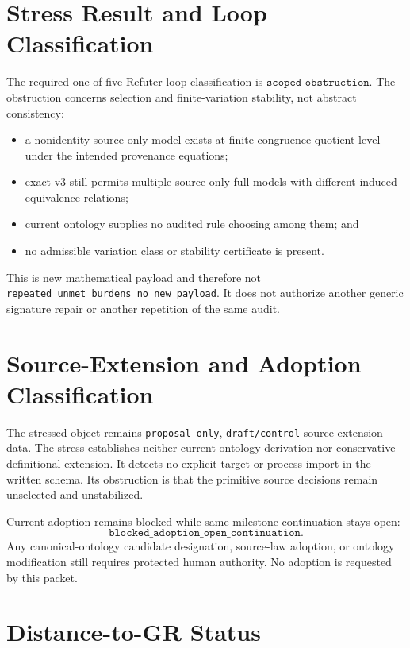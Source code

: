 \documentclass[11pt]{article}
\begin{document}
\section{Stress Result and Loop Classification}

The required one-of-five Refuter loop classification is
\(\texttt{scoped\_obstruction}\). The obstruction concerns selection and
finite-variation stability, not abstract consistency:
\begin{itemize}[leftmargin=*]
  \item a nonidentity source-only model exists at finite
  congruence-quotient level under the intended provenance equations;
  \item exact v3 still permits multiple source-only full models with different
  induced equivalence relations;
  \item current ontology supplies no audited rule choosing among them; and
  \item no admissible variation class or stability certificate is present.
\end{itemize}

This is new mathematical payload and therefore not
\texttt{repeated\_unmet\_burdens\_no\_new\_payload}. It does not authorize
another generic signature repair or another repetition of the same audit.

\section{Source-Extension and Adoption Classification}

The stressed object remains \texttt{proposal-only}, \texttt{draft/control}
source-extension data. The stress establishes neither current-ontology
derivation nor conservative definitional extension. It detects no explicit
target or process import in the written schema. Its obstruction is that the
primitive source decisions remain unselected and unstabilized.

Current adoption remains blocked while same-milestone continuation stays open:
\[
 \texttt{blocked\_adoption\_open\_continuation}.
\]
Any canonical-ontology candidate designation, source-law adoption, or
ontology modification still requires protected human authority. No adoption
is requested by this packet.

\section{Distance-to-GR Status}
\end{document}
